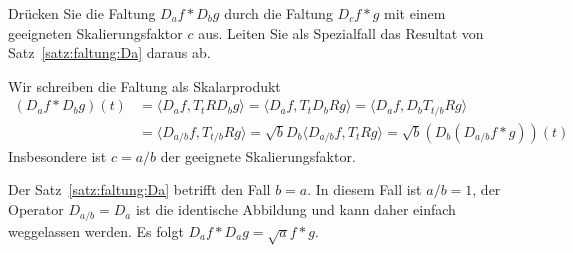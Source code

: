 Drücken Sie die Faltung $D_af * D_bg$ durch die Faltung $D_cf*g$ mit einem
geeigneten Skalierungsfaktor $c$ aus.
Leiten Sie als Spezialfall das Resultat von Satz~\ref{satz:faltung:Da} daraus
ab.

\begin{loesung}
Wir schreiben die Faltung als Skalarprodukt
\begin{align*}
(D_af * D_bg)(t)
&=
\langle D_af, T_tRD_bg\rangle
=
\langle D_af, T_tD_bRg\rangle
=
\langle D_af, D_bT_{t/b}Rg\rangle
\\
&=
\langle D_{a/b}f, T_{t/b}Rg\rangle
=
\sqrt{b} D_b
\langle D_{a/b}f, T_tRg\rangle
=
\sqrt{b}(D_b (D_{a/b}f * g))(t)
\end{align*}
Insbesondere ist $c=a/b$ der geeignete Skalierungsfaktor.

Der Satz~\ref{satz:faltung:Da} betrifft den Fall $b=a$. 
In diesem Fall ist $a/b=1$, der Operator $D_{a/b}=D_a$ ist die identische
Abbildung und kann daher einfach weggelassen werden.
Es folgt $D_af*D_ag = \sqrt{a} f*g$.
\end{loesung}

